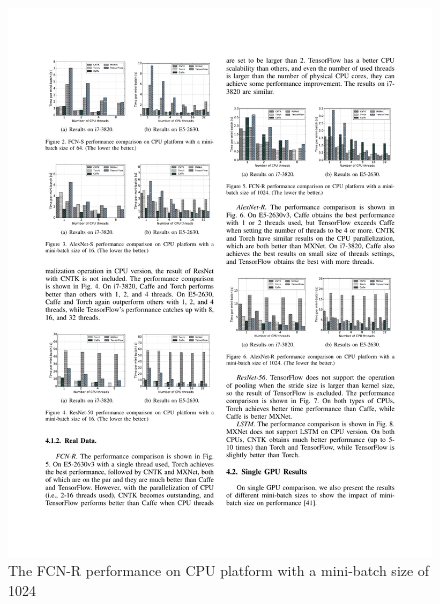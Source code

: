 \documentclass[11pt, oneside]{article}   	%
\begin{document}
\begin{figure}[htbp] 
	\includegraphics[width=\linewidth]{figures/FCN-R1.pdf} 
	\caption{The FCN-R performance on CPU platform with a mini-batch size of 1024}
\end{figure}
%
\end{document}
